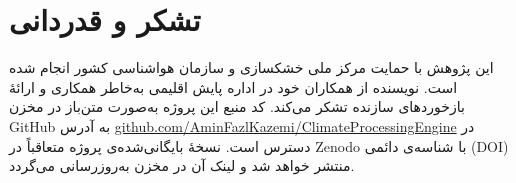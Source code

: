 \documentclass[12pt,a4paper,twocolumn]{article}
\begin{document}
\section*{تشکر و قدردانی}
این پژوهش با حمایت مرکز ملی خشکسازی و سازمان هواشناسی کشور انجام شده است. نویسنده از همکاران خود در اداره پایش اقلیمی به‌خاطر همکاری و ارائهٔ بازخوردهای سازنده تشکر می‌کند. کد منبع این پروژه به‌صورت متن‌باز در مخزن GitHub به آدرس \href{https://github.com/AminFazlKazemi/ClimateProcessingEngine}{github.com/AminFazlKazemi/ClimateProcessingEngine} در دسترس است. نسخهٔ بایگانی‌شده‌ی پروژه متعاقباً در Zenodo با شناسه‌ی دائمی (DOI) منتشر خواهد شد و لینک آن در مخزن به‌روزرسانی می‌گردد.

\end{document}

